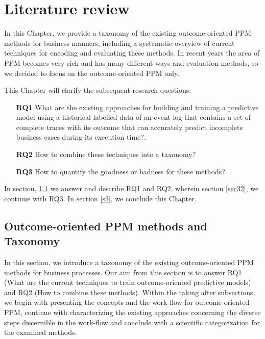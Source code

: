 
\chapter{Literature review} \label{ch3} %

In this Chapter, we provide a taxonomy of the existing outcome-oriented PPM methods for business manners, including a systematic overview of current techniques for encoding and evaluating these methods. In recent years the area of PPM becomes very rich and has many different ways and evaluation methods, so we decided to focus on the outcome-oriented PPM only.

This Chapter will clarify the subsequent research questions:


	\begin{itemize}[itemindent=0em]
		\item[\textbf{RQ1}] What are the existing approaches for building and training a predictive model using a historical labelled data of an event log that contains a set of complete traces with its outcome that can accurately predict incomplete business cases during its execution time?.		
		\item[\textbf{RQ2}]  How to combine these techniques into a taxonomy?		
		\item[\textbf{RQ3}] How to quantify the goodness or badness for these methods?  
			
	\end{itemize}

In section, \ref{rq12} we answer and describe RQ1 and RQ2, wherein section \ref{sec32}, we continue with RQ3.  In section \ref{s3}, we conclude this Chapter. 


\ifpdf
    \graphicspath{{X/figures/PNG/}{X/figures/PDF/}{X/figures/}}
\else
    \graphicspath{{X/figures/EPS/}{X/figures/}}
\fi


 

\section{Outcome-oriented PPM methods and Taxonomy} \label{rq12}
In this section, we introduce a taxonomy of the existing outcome-oriented PPM methods for business processes. Our aim from this section is to answer RQ1 (What are the current techniques to train outcome-oriented predictive models) and RQ2 (How to combine these methods). Within the taking after subsections, we begin with presenting the concepts and the work-flow for outcome-oriented PPM, continue with characterizing the existing approaches concerning the diverse steps discernible in the work-flow and conclude with a scientific categorization for the examined methods.


